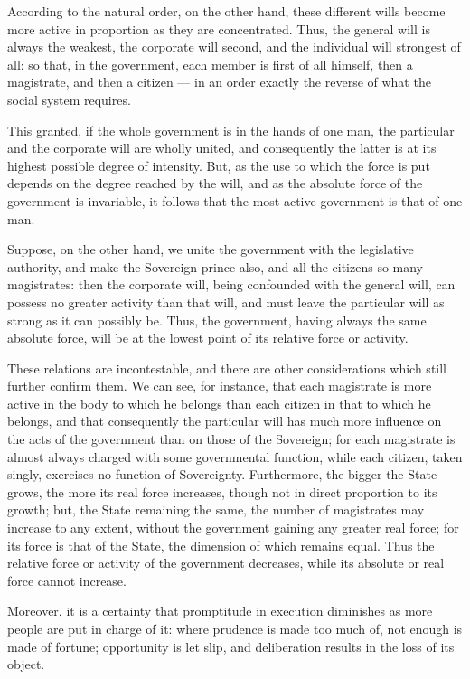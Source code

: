 \documentclass[12pt]{report}
\begin{document}
According to the natural order, on the other hand, these different wills become more active in proportion as they are concentrated. Thus, the general will is always the weakest, the corporate will second, and the individual will strongest of all: so that, in the government, each member is first of all himself, then a magistrate, and then a citizen — in an order exactly the reverse of what the social system requires.

This granted, if the whole government is in the hands of one man, the particular and the corporate will are wholly united, and consequently the latter is at its highest possible degree of intensity. But, as the use to which the force is put depends on the degree reached by the will, and as the absolute force of the government is invariable, it follows that the most active government is that of one man.

Suppose, on the other hand, we unite the government with the legislative authority, and make the Sovereign prince also, and all the citizens so many magistrates: then the corporate will, being confounded with the general will, can possess no greater activity than that will, and must leave the particular will as strong as it can possibly be. Thus, the government, having always the same absolute force, will be at the lowest point of its relative force or activity.

These relations are incontestable, and there are other considerations which still further confirm them. We can see, for instance, that each magistrate is more active in the body to which he belongs than each citizen in that to which he belongs, and that consequently the particular will has much more influence on the acts of the government than on those of the Sovereign; for each magistrate is almost always charged with some governmental function, while each citizen, taken singly, exercises no function of Sovereignty. Furthermore, the bigger the State grows, the more its real force increases, though not in direct proportion to its growth; but, the State remaining the same, the number of magistrates may increase to any extent, without the government gaining any greater real force; for its force is that of the State, the dimension of which remains equal. Thus the relative force or activity of the government decreases, while its absolute or real force cannot increase.

Moreover, it is a certainty that promptitude in execution diminishes as more people are put in charge of it: where prudence is made too much of, not enough is made of fortune; opportunity is let slip, and deliberation results in the loss of its object.
\end{document}
